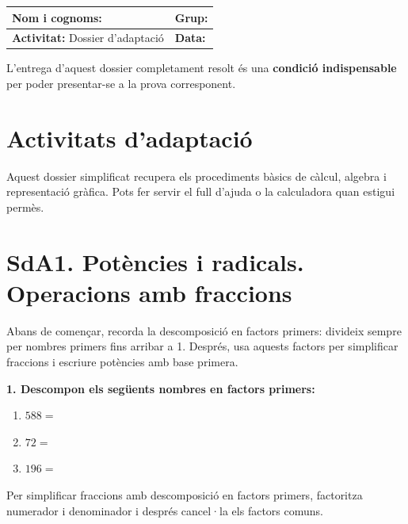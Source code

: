 \documentclass[12pt,a4paper]{article}
\begin{document}
\begingroup
\renewcommand{\arraystretch}{2.2}
\begin{tabularx}{\textwidth}{|X|p{4cm}|}
\hline
\textbf{Nom i cognoms:} & \textbf{Grup:} \\ \hline
\textbf{Activitat:} Dossier d’adaptació & \textbf{Data:} \\ \hline
\end{tabularx}
\endgroup

\vspace{0.5cm}

\begin{tcolorbox}[colback=red!5!white, colframe=red!75!black, title=Condició d'Examen, fonttitle=\bfseries\large, arc=2mm]
L'entrega d'aquest dossier completament resolt és una \textbf{condició indispensable} per poder presentar-se a la prova corresponent.
\end{tcolorbox}

\section*{Activitats d'adaptació}

\begin{capsula}
Aquest dossier simplificat recupera els procediments bàsics de càlcul, algebra i representació gràfica. Pots fer servir el full d'ajuda o la calculadora quan estigui permès.
\end{capsula}

\section*{SdA1. Potències i radicals. Operacions amb fraccions}

\begin{capsula}
Abans de començar, recorda la descomposició en factors primers: divideix sempre per nombres primers fins arribar a 1. Després, usa aquests factors per simplificar fraccions i escriure potències amb base primera.
\end{capsula}

\textbf{1. Descompon els següents nombres en factors primers:}
\begin{enumerate}[label=\alph*)]
    \item $588 =$ \vspace{0.7cm}
    \item $72 =$ \vspace{0.7cm}
    \item $196 =$ \vspace{0.7cm}
\end{enumerate}
\newpage
\begin{capsula}
Per simplificar fraccions amb descomposició en factors primers, factoritza numerador i denominador i després cancel·la els factors comuns.
\end{capsula}
\end{document}
